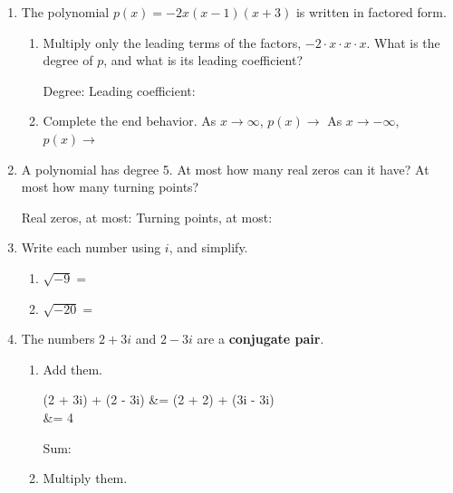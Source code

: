 \documentclass[10pt]{article}
\begin{document}

\vspace{0.12in}

\begin{enumerate}[itemsep=10pt]

\item The polynomial $p(x) = -2x(x - 1)(x + 3)$ is written in factored form.

\begin{enumerate}[label=(\alph*), itemsep=6pt]
  \item Multiply only the leading terms of the factors, $-2 \cdot x \cdot x \cdot x$. What is the
        degree of $p$, and what is its leading coefficient?

        Degree:  \qquad Leading coefficient: 
  \item Complete the end behavior.
        \quad As $x \to \infty$, $p(x) \to$ \ans{$-\infty$} \qquad
        As $x \to -\infty$, $p(x) \to$ \ans{$\infty$}
\end{enumerate}

\item A polynomial has degree 5. At most how many real zeros can it have? At most how many
turning points?

\vspace{0.1in}
Real zeros, at most:  \qquad Turning points, at most: 

\item Write each number using $i$, and simplify.

\begin{enumerate}[label=(\alph*), itemsep=6pt]
  \item $\sqrt{-9} = $ 
  \item $\sqrt{-20} = $ 
\end{enumerate}

\item The numbers $2 + 3i$ and $2 - 3i$ are a \textbf{conjugate pair}.

\begin{enumerate}[label=(\alph*), itemsep=6pt]
  \item Add them.

\begin{work}
  (2 + 3i) + (2 - 3i) &= (2 + 2) + (3i - 3i) \\
                      &= 4
\end{work}

        Sum: 
  \item Multiply them.


\end{enumerate}
\end{enumerate}
\end{document}
